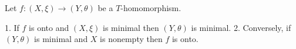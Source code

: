 Let $f: (X, \xi) \longrightarrow (Y, \theta)$ be a $T$-homomorphism.

1. If $f$ is onto and $(X, \xi)$ is minimal then $(Y, \theta)$ is minimal.
2. Conversely, if $(Y, \theta)$ is minimal and $X$ is nonempty then $f$ is onto.
